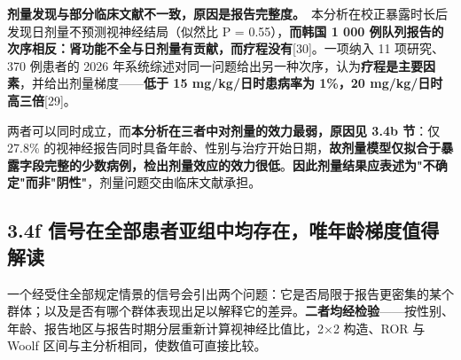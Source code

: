 \documentclass[UTF8,fontset=windows,11pt]{ctexart}
\begin{document}
\textbf{剂量发现与部分临床文献不一致，原因是报告完整度。}\ 本分析在校正暴露时长后发现日剂量不预测视神经结局（似然比 P = 0.55），\textbf{而韩国 1 000 例队列报告的次序相反：肾功能不全与日剂量有贡献，而疗程没有}[30]。一项纳入 11 项研究、370 例患者的 2026 年系统综述对同一问题给出另一种次序，认为\textbf{疗程是主要因素}，并给出剂量梯度——\textbf{低于 15 mg/kg/日时患病率为 1\%，20 mg/kg/日时高三倍}[29]。

两者可以同时成立，而\textbf{本分析在三者中对剂量的效力最弱，原因见 3.4b 节}：仅 27.8\% 的视神经报告同时具备年龄、性别与治疗开始日期，\textbf{故剂量模型仅拟合于暴露字段完整的少数病例，检出剂量效应的效力很低}。\textbf{因此剂量结果应表述为"不确定"而非"阴性"}，剂量问题交由临床文献承担。

\subsection{3.4f 信号在全部患者亚组中均存在，唯年龄梯度值得解读}

一个经受住全部规定情景的信号会引出两个问题：它是否局限于报告更密集的某个群体；以及是否有哪个群体表现出足以解释它的差异。\textbf{二者均经检验}——按性别、年龄、报告地区与报告时期分层重新计算视神经比值比，2×2 构造、ROR 与 Woolf 区间与主分析相同，使数值可直接比较。
\end{document}
